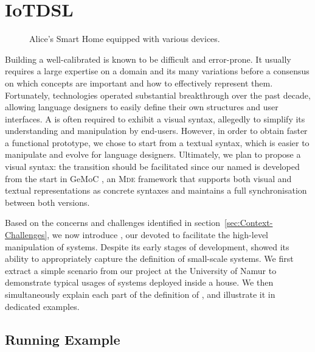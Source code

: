 \section{IoTDSL}
\label{sec:IoTDSL}

\begin{figure*}%
\caption{Alice's Smart Home equipped with various devices.}%
\label{fig:RE}%
\end{figure*}

Building a well-calibrated \DSL is known to be difficult and error-prone. It usually requires a large expertise on a domain and its many variations before a consensus on which concepts are important and how to effectively represent them. Fortunately, \MDE technologies operated substantial breakthrough over the past decade, allowing language designers to easily define their own \DSL structures and user interfaces. A \DSL is often required to exhibit a visual syntax, allegedly to simplify its understanding and manipulation by end-users. However, in order to obtain faster a functional prototype, we chose to start from a textual syntax, which is easier to manipulate and evolve for language designers. Ultimately, we plan to propose a visual syntax: the transition should be facilitated since our \DSL named \IOTDSL is developed from the start in GeMoC \cite{combemale-14}, an \textsc{Mde} framework that supports both visual and textual representations as concrete syntaxes and maintains a full synchronisation between both versions.

Based on the concerns and challenges identified in section~\ref{sec:Context-Challenges}, we now introduce \IOTDSL, our \DSL devoted to facilitate the high-level manipulation of \IOT systems. Despite its early stages of development, \IOTDSL showed its ability to appropriately capture the definition of small-scale \IOT systems. We first extract a simple scenario from our project at the University of Namur to demonstrate typical usages of \IOT systems deployed inside a house. We then simultaneously explain each part of the definition of \IOTDSL, and illustrate it in dedicated examples.

\subsection{Running Example}
\label{sec:IoTDSL-Example}


